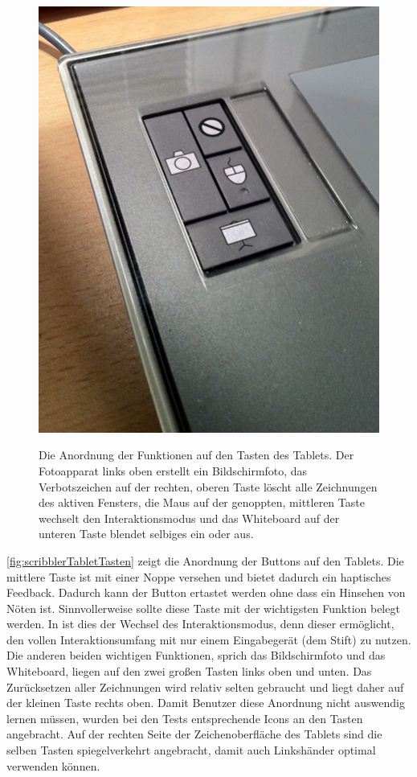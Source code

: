 \begin{figure}
	\begin{center}
        {\includegraphics[width=0.8\linewidth]{gfx/scribblerTabletTasten}}
		\caption[Tablet Tastenbelegung]{Die Anordnung der \scribbler Funktionen auf den Tasten des Tablets. Der Fotoapparat links oben erstellt ein Bildschirmfoto, das Verbotszeichen auf der rechten, oberen Taste löscht alle Zeichnungen des aktiven Fensters, die Maus auf der genoppten, mittleren Taste wechselt den Interaktionsmodus und das Whiteboard auf der unteren Taste blendet selbiges ein oder aus.}\label{fig:scribblerTabletTasten}
	\end{center}
\end{figure}

\autoref{fig:scribblerTabletTasten} zeigt die Anordnung der Buttons auf den Tablets. Die mittlere Taste ist mit einer Noppe versehen und bietet dadurch ein haptisches Feedback. Dadurch kann der Button ertastet werden ohne dass ein Hinsehen von Nöten ist. Sinnvollerweise sollte diese Taste mit der wichtigsten Funktion belegt werden. In \scribbler ist dies der Wechsel des Interaktionsmodus, denn dieser ermöglicht, den vollen Interaktionsumfang mit nur einem Eingabegerät (dem Stift) zu nutzen. Die anderen beiden wichtigen Funktionen, sprich das Bildschirmfoto und das Whiteboard, liegen auf den zwei großen Tasten links oben und unten. Das Zurücksetzen aller Zeichnungen wird relativ selten gebraucht und liegt daher auf der kleinen Taste rechts oben. Damit Benutzer diese Anordnung nicht auswendig lernen müssen, wurden bei den Tests entsprechende Icons an den Tasten angebracht. Auf der rechten Seite der Zeichenoberfläche des Tablets sind die selben Tasten spiegelverkehrt angebracht, damit auch Linkshänder \scribbler optimal verwenden können.

